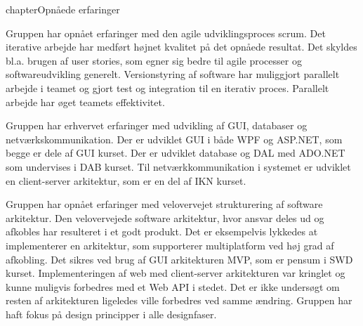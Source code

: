 {chapter}Opnåede erfaringer



Gruppen har opnået erfaringer med den agile udviklingsproces scrum. Det iterative arbejde har medført højnet kvalitet på det opnåede resultat. Det skyldes bl.a. brugen af user stories, som egner sig bedre til agile processer og softwareudvikling generelt. Versionstyring af software har muliggjort parallelt arbejde i teamet og gjort test og integration til en iterativ proces. Parallelt arbejde har øget teamets effektivitet. 

Gruppen har erhvervet erfaringer med udvikling af GUI, databaser og netværkskommunikation. Der er udviklet GUI i både WPF og ASP.NET, som begge er dele af GUI kurset. Der er udviklet database og DAL med ADO.NET som undervises i DAB kurset. Til netværkkommunikation i systemet er udviklet en client-server arkitektur, som er en del af IKN kurset. 

Gruppen har opnået erfaringer med velovervejet strukturering af software arkitektur. Den velovervejede software arkitektur, hvor ansvar deles ud og afkobles har resulteret i et godt produkt. Det er eksempelvis lykkedes at implementerer en arkitektur, som supporterer multiplatform ved høj grad af afkobling. Det sikres ved brug af GUI arkitekturen MVP, som er pensum i SWD kurset. Implementeringen af web med client-server arkitekturen var kringlet og kunne muligvis forbedres med et Web API i stedet. Det er ikke undersøgt om resten af arkitekturen ligeledes ville forbedres ved samme ændring. Gruppen har haft fokus på design principper i alle designfaser. 

